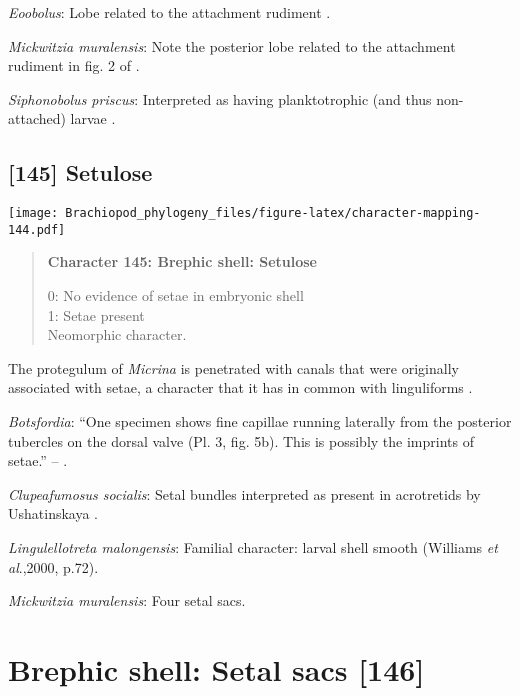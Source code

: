 \documentclass[openany]{book}
\theoremstyle{definition}
\theoremstyle{definition}
\theoremstyle{definition}
\theoremstyle{remark}
\begin{document}
\hypertarget{Eoobolus-coding-144}{}
\emph{Eoobolus}: Lobe related to the attachment rudiment \citep[fig.
2]{Balthasar2009Thebrachiopod}.

\hypertarget{Mickwitzia_muralensis-coding-144}{}
\emph{Mickwitzia muralensis}: Note the posterior lobe related to the
attachment rudiment in fig. 2 of \citet{Balthasar2009Thebrachiopod}.

\hypertarget{Siphonobolus_priscus-coding-144}{}
\emph{Siphonobolus priscus}: Interpreted as having planktotrophic (and
thus non-attached) larvae \citep{Popov2009Earlyontogeny}.

\subsection*{{[}145{]} Setulose}\label{setulose}

\texttt{[image: Brachiopod\_phylogeny\_files/figure-latex/character-mapping-144.pdf]}

\begin{quote}
\textbf{Character 145: Brephic shell: Setulose}

0: No evidence of setae in embryonic shell\\
1: Setae present\\
Neomorphic character.
\end{quote}

The protegulum of \emph{Micrina} is penetrated with canals that were
originally associated with setae, a character that it has in common with
linguliforms \citep{Holmer2011Firstrecord}.

\hypertarget{Botsfordia-coding-145}{}
\emph{Botsfordia}: ``One specimen shows fine capillae running laterally
from the posterior tubercles on the dorsal valve (Pl. 3, fig. 5b). This
is possibly the imprints of setae.'' --
\citet{Ushatinskaya2016Revisionof}.

\hypertarget{Clupeafumosus_socialis-coding-145}{}
\emph{Clupeafumosus socialis}: Setal bundles interpreted as present in
acrotretids by Ushatinskaya \citeyearpar{Ushatinskaya2016Protegulumand}.

\hypertarget{Lingulellotreta_malongensis-coding-145}{}
\emph{Lingulellotreta malongensis}: Familial character: larval shell
smooth (Williams \emph{et al}.,2000, p.72).

\hypertarget{Mickwitzia_muralensis-coding-145}{}
\emph{Mickwitzia muralensis}: Four setal sacs.

\section{Brephic shell: Setal sacs
{[}146{]}}\label{brephic-shell-setal-sacs-146}
\end{document}

